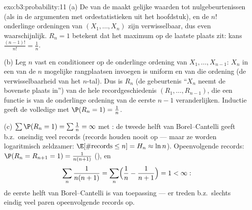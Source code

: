 \begin{solution}{exo:b3:probability:11}
(a) De  van de  maakt gelijke waarden tot
nulgebeurtenissen (als in de argumenten met ordestatistieken uit
het hoofdstuk), en de $n!$ onderlinge ordeningen van $(X_1,
\dots, X_n)$ zijn verwisselbaar, dus even waarschijnlijk. $R_n =
1$ betekent dat het maximum op de laatste plaats zit: kans
$\frac{(n-1)!}{n!} = \frac1n$.

(b) Leg $n$ vast en conditioneer op de onderlinge ordening van
$X_1, \dots, X_{n-1}$: $X_n$ in een van de $n$ mogelijke
rangplaatsen invoegen is uniform en  van die
ordening (de verwisselbaarheid van het $n$-tal). Dus is $R_n$ (de
gebeurtenis ``$X_n$ neemt de bovenste plaats in'') 
van de hele recordgeschiedenis $(R_1, \dots, R_{n-1})$, die een
functie is van de onderlinge ordening van de eerste $n - 1$
veranderlijken. Inductie geeft de volledige  met
$\P(R_n = 1) = \frac1n$.

(c) $\sum\P(R_n = 1) = \sum\frac1n = \infty$ met
: de tweede helft van Borel--Cantelli geeft
b.z.\ oneindig veel records (records houden nooit op --- maar ze
worden logaritmisch zeldzamer: $\E[\#\text{records} \leq n] = H_n
\approx \ln n$). Opeenvolgende records: $\P(R_n = R_{n+1} = 1) =
\frac1{n(n+1)}$ (), en
\[
\sum_n\frac1{n(n+1)} = \sum_n\Bigl(\frac1n -
\frac1{n+1}\Bigr) = 1 < \infty :
\]
de eerste helft van Borel--Cantelli is van toepassing --- er
treden b.z.\ slechts eindig veel paren opeenvolgende records op.
\end{solution}

